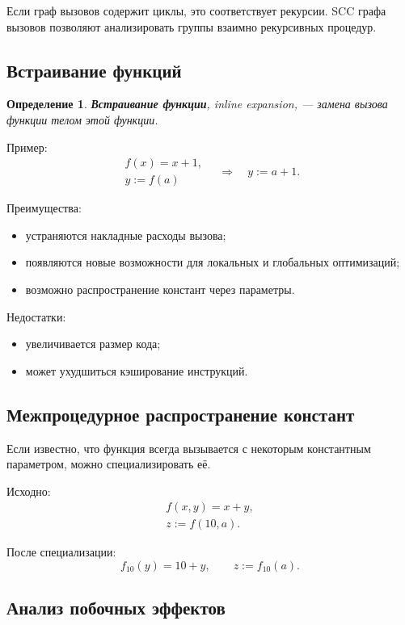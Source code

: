 \documentclass[12pt,a4paper]{article}
\newtheorem{definition}{Определение}
\begin{document}
Если граф вызовов содержит циклы, это соответствует рекурсии. SCC графа вызовов позволяют анализировать группы взаимно рекурсивных процедур.

\subsection{Встраивание функций}

\begin{definition}
\textbf{Встраивание функции}, inline expansion, --- замена вызова функции телом этой функции.
\end{definition}

Пример:
\[
\begin{array}{l}
f(x)=x+1,\\
y:=f(a)
\end{array}
\quad \Rightarrow \quad
y:=a+1.
\]

Преимущества:
\begin{itemize}
    \item устраняются накладные расходы вызова;
    \item появляются новые возможности для локальных и глобальных оптимизаций;
    \item возможно распространение констант через параметры.
\end{itemize}

Недостатки:
\begin{itemize}
    \item увеличивается размер кода;
    \item может ухудшиться кэширование инструкций.
\end{itemize}

\subsection{Межпроцедурное распространение констант}

Если известно, что функция всегда вызывается с некоторым константным параметром, можно специализировать её.

Исходно:
\[
\begin{array}{l}
f(x,y)=x+y,\\
z:=f(10,a).
\end{array}
\]

После специализации:
\[
f_{10}(y)=10+y,
\qquad
z:=f_{10}(a).
\]

\subsection{Анализ побочных эффектов}
\end{document}
